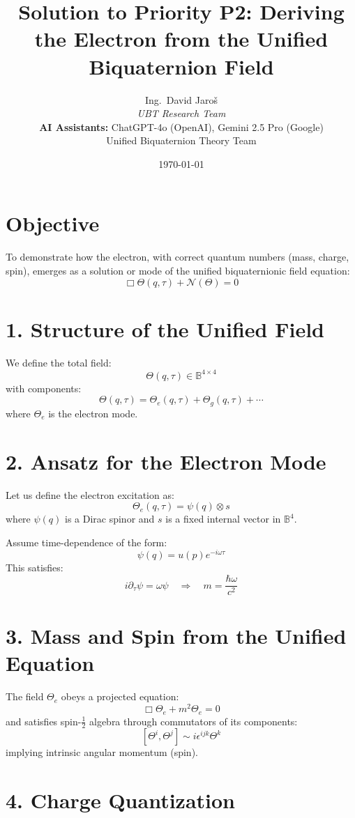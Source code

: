 \documentclass[12pt]{article}
\title{Solution to Priority P2: Deriving the Electron from the Unified Biquaternion Field}
\author{
Ing.~David Jaroš \\
\textit{UBT Research Team} \\
\textbf{AI Assistants:} ChatGPT-4o (OpenAI), Gemini 2.5 Pro (Google) \\
Unified Biquaternion Theory Team}
\date{\today}
\begin{document}
\maketitle

\section*{Objective}

To demonstrate how the electron, with correct quantum numbers (mass, charge, spin), emerges as a solution or mode of the unified biquaternionic field equation:
\[
\Box \Theta(q, \tau) + \mathcal{N}(\Theta) = 0
\]

\section*{1. Structure of the Unified Field}

We define the total field:
\[
\Theta(q, \tau) \in \mathbb{B}^{4 \times 4}
\]
with components:
\[
\Theta(q, \tau) = \Theta_e(q, \tau) + \Theta_g(q, \tau) + \cdots
\]
where $\Theta_e$ is the electron mode.

\section*{2. Ansatz for the Electron Mode}

Let us define the electron excitation as:
\[
\Theta_e(q, \tau) = \psi(q) \otimes s
\]
where $\psi(q)$ is a Dirac spinor and $s$ is a fixed internal vector in $\mathbb{B}^{4}$.

Assume time-dependence of the form:
\[
\psi(q) = u(p) e^{-i \omega \tau}
\]
This satisfies:
\[
i \partial_\tau \psi = \omega \psi \quad \Rightarrow \quad m = \frac{\hbar \omega}{c^2}
\]

\section*{3. Mass and Spin from the Unified Equation}

The field $\Theta_e$ obeys a projected equation:
\[
\Box \Theta_e + m^2 \Theta_e = 0
\]
and satisfies spin-$\frac{1}{2}$ algebra through commutators of its components:
\[
[\Theta^i, \Theta^j] \sim i \epsilon^{ijk} \Theta^k
\]
implying intrinsic angular momentum (spin).

\section*{4. Charge Quantization}
\end{document}
